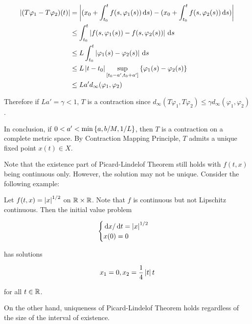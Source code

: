 \documentclass[a4paper,12pt]{article}
\begin{document}
\begin{thm}
  $$\begin{aligned}[t]
    \left| (T\varphi_{1}-T\varphi_{2})(t)\right|&=\left| (x_{0}+\int_{t_{0}}^{t}f(s,\varphi_{1}(s))\,\mathrm{d} s)-(x_{0}+\int_{t_{0}}^{t}f(s,\varphi_{2}(s))\,\mathrm{d} s)\right|\\
    &\leq\int_{t_{0}}^{t}\left| f(s,\varphi_{1}(s))-f(s,\varphi_{2}(s))\right|\,\mathrm{d} s\\
    &\leq L\int_{t_{0}}^{t}\left| \varphi_{1}(s)-\varphi_{2}(s)\right|\,\mathrm{d} s\\
    &\leq L\left| t-t_{0}\right|\underset{[t_{0}-a',t_{0}+a']}{\sup}\left\{ \varphi_{1}(s)-\varphi_{2}(s)\right\}\\
    &\leq La'd_{\infty}(\varphi_{1},\varphi_{2})
  \end{aligned}$$\s

  Therefore if $La'=\gamma<1$, $T$ is a contraction since $d_{\infty}(T\varphi_{1},T\varphi_{2})\leq\gamma d_{\infty}(\varphi_{1},\varphi_{2})$.\n

  In conclusion, if $0<a'<\min\left\{ a,b/M,1/L\right\}$, then $T$ is a contraction on a complete metric space. By Contraction Mapping Principle, $T$ admits a unique fixed point $x(t)\in X$.
\end{thm}\n

Note that the existence part of Picard-Lindelof Theorem still holds with $f(t,x)$ being continuous only. However, the solution may not be unique. Consider the following example:\n

\begin{exm}
  Let $f(t,x)=\left| x\right|^{1/2}$ on $\mathbb{R}\times\mathbb{R}$. Note that $f$ is continuous but not Lipschitz continuous. Then the initial value problem

  $$\begin{cases}
    \,\mathrm{d} x/\,\mathrm{d} t=\left| x\right|^{1/2}\\
    x(0)=0
  \end{cases}$$\s

  has solutions
  
  $$x_{1}=0,x_{2}=\frac{1}{4}\left| t\right|t$$\s
  
  for all $t\in\mathbb{R}$.
\end{exm}\n

On the other hand, uniqueness of Picard-Lindelof Theorem holds regardless of the size of the interval of existence.
\end{document}
